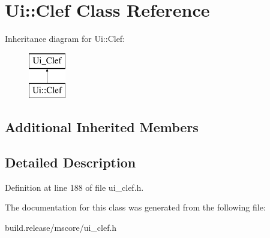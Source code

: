 \hypertarget{class_ui_1_1_clef}{}\section{Ui\+:\+:Clef Class Reference}
\label{class_ui_1_1_clef}
Inheritance diagram for Ui\+:\+:Clef\+:\begin{figure}[H]
\begin{center}
\leavevmode
\includegraphics[height=2.000000cm]{class_ui_1_1_clef}
\end{center}
\end{figure}
\subsection*{Additional Inherited Members}


\subsection{Detailed Description}


Definition at line 188 of file ui\+\_\+clef.\+h.



The documentation for this class was generated from the following file\+:\begin{DoxyCompactItemize}
\item 
build.\+release/mscore/ui\+\_\+clef.\+h\end{DoxyCompactItemize}
